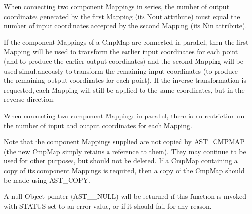 \documentclass[twoside,11pt]{article}
\newcommand{\htmlref}[2]{#1}
\begin{document}
{{{         \sstitem
         When connecting two component Mappings in series, the number
         of output coordinates generated by the first Mapping (its \htmlref{Nout}{Nout}
         attribute) must equal the number of input coordinates accepted
         by the second Mapping (its \htmlref{Nin}{Nin} attribute).

         \sstitem
         If the component Mappings of a CmpMap are connected in
         parallel, then the first Mapping will be used to transform the
         earlier input coordinates for each point (and to produce the
         earlier output coordinates) and the second Mapping will be used
         simultaneously to transform the remaining input coordinates (to
         produce the remaining output coordinates for each point). If the
         inverse transformation is requested, each Mapping will still be
         applied to the same coordinates, but in the reverse direction.

         \sstitem
         When connecting two component Mappings in parallel, there is
         no restriction on the number of input and output coordinates for
         each Mapping.

         \sstitem
         Note that the component Mappings supplied are not copied by
         AST\_CMPMAP (the new CmpMap simply retains a reference to
         them). They may continue to be used for other purposes, but
         should not be deleted. If a CmpMap containing a copy of its
         component Mappings is required, then a copy of the CmpMap should
         be made using \htmlref{AST\_COPY}{AST_COPY}.

         \sstitem
         A null \htmlref{Object}{Object} pointer (AST\_\_NULL) will be returned if this
         function is invoked with STATUS set to an error value, or if it
         should fail for any reason.
      }
   }
}
\end{document}
